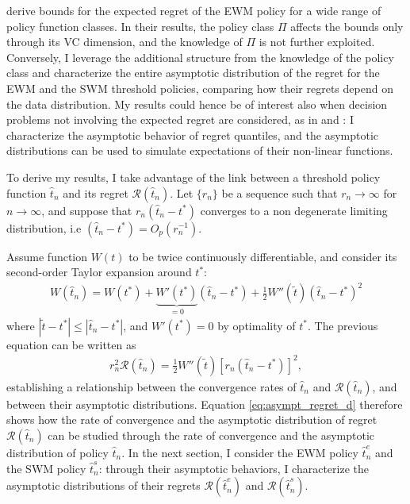 {\cite{kitagawa2018should} derive bounds for the expected regret of the EWM policy for a wide range of policy function classes. In their results, the policy class $\Pi$ affects the bounds only through its VC dimension, and the knowledge of $\Pi$ is not further exploited. Conversely, I leverage the additional structure from the knowledge of the policy class and characterize the entire asymptotic distribution of the regret for the EWM and the SWM threshold policies, comparing how their regrets depend on the data distribution. My results could hence be of interest also when decision problems not involving the expected regret are considered, as in \cite{manski2023statistical} and \cite{kitagawa2022treatment}: I characterize the asymptotic behavior of regret quantiles, and the asymptotic distributions can be used to simulate expectations of their non-linear functions.

To derive my results, I take advantage of the link between a threshold policy function $\hat{t}_n$ and its regret $\mathcal{R}(\hat{t}_n)$. Let $\{r_n\}$ be a sequence such that $r_n \rightarrow \infty$ for $n \rightarrow \infty$, and suppose that $r_n (\hat{t}_n - t^*)$ converges to a non degenerate limiting distribution, i.e $(\hat{t}_n - t^*) = O_p(r_n^{-1})$. 

Assume function $W(t)$ to be twice continuously differentiable, and consider its second-order Taylor expansion around $t^*$:
\begin{gather*}
    W(\hat{t}_n) = W(t^*) + \underbrace{W'(t^*)}_{=0} \left(\hat{t}_n-t^*\right) + \frac{1}{2} W''(\tilde{t}) \left(\hat{t}_n-t^*\right)^2
\end{gather*}
where $|\tilde{t}-t^*| \leq |\hat{t}_n - t^*|$, and $W'(t^*)=0$ by optimality of $t^*$. The previous equation can be written as
\begin{gather} \label{eq:asympt_regret_d}
    r_n^2 \mathcal{R}(\hat{t}_n) = \frac{1}{2} W''(\tilde{t}) \left[r_n\left(\hat{t}_n-t^*\right)\right]^2,
\end{gather}
establishing a relationship between the convergence rates of $\hat{t}_n$ and $\mathcal{R}(\hat{t}_n)$, and between their asymptotic distributions. Equation \eqref{eq:asympt_regret_d} therefore shows how the rate of convergence and the asymptotic distribution of regret $\mathcal{R}(\hat{t}_n)$ can be studied through the rate of convergence and the asymptotic distribution of policy $\hat{t}_n$. In the next section, I consider the EWM policy $\hat{t}^e_n$ and the SWM policy $\hat{t}^s_n$: through their asymptotic behaviors, I characterize the asymptotic distributions of their regrets $\mathcal{R}(\hat{t}^e_n)$ and $\mathcal{R}(\hat{t}^s_n)$.

}
